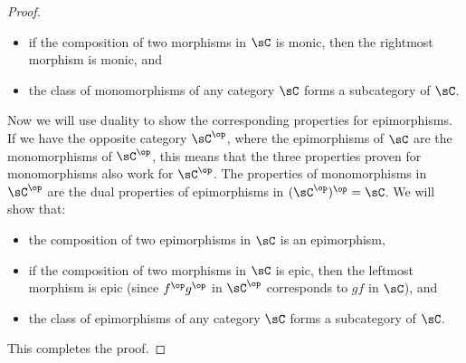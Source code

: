\documentclass[main.tex]{subfiles}
\begin{document}
\begin{proof}
\begin{itemize}
		\item if the composition of two morphisms in \(\sC\) is monic, then the
			rightmost morphism is monic, and

		\item the class of monomorphisms of any category \(\sC\) forms a
			subcategory of \(\sC\).
	\end{itemize}

	Now we will use duality to show the corresponding properties for
	epimorphisms. If we have the opposite category \(\sC^{\op}\), where the
	epimorphisms of \(\sC\) are the monomorphisms of \(\sC^{\op}\), this means
	that the three properties proven for monomorphisms also work for
	\(\sC^{\op}\). The properties of monomorphisms in \(\sC^{\op}\) are the dual
	properties of epimorphisms in \((\sC^{\op})^{\op} = \sC\). We will show that:
	\begin{itemize}
		\item the composition of two epimorphisms in \(\sC\) is an epimorphism,

		\item if the composition of two morphisms in \(\sC\) is epic, then the
			leftmost morphism is epic (since \(f^\op g^\op\) in \(\sC^\op\)
			corresponds to \(gf\) in \(\sC\)), and

		\item the class of epimorphisms of any category \(\sC\) forms a
			subcategory of \(\sC\).
	\end{itemize}
	This completes the proof.
\end{proof}
\end{document}

